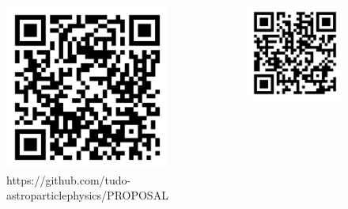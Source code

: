 \documentclass[aspectratio=1610, captions=tableheading, 11pt]{beamer}
\begin{document}



\section{}

\begin{frame}[t]
  \vspace{-5mm}
  \begin{minipage}[t][0.8\textheight][t]{\textwidth}
      \begin{columns}
      \begin{figure}
          \centering
          \includegraphics[width=0.6\linewidth]{plots/github.pdf}
           \captionsetup{format=myformat}
          \caption*{https://github.com/tudo-\\astroparticlephysics/PROPOSAL}
      \end{figure}
      \begin{figure}
          \centering
          \includegraphics[width=0.6\linewidth]{plots/arxiv.pdf}

\end{figure}
\end{columns}
\end{minipage}
\end{frame}
\end{document}
